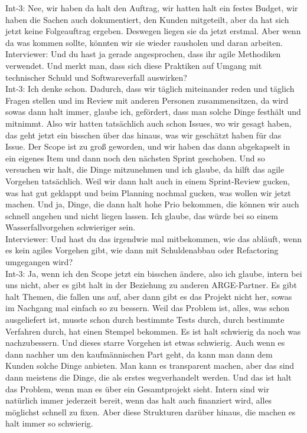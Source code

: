 Int-3: Nee, wir haben da halt den Auftrag, wir hatten halt ein festes Budget, wir haben die Sachen auch dokumentiert, den Kunden mitgeteilt, aber da hat sich jetzt keine Folgeauftrag ergeben. Deswegen liegen sie da jetzt erstmal. Aber wenn da was kommen sollte, könnten wir sie wieder rausholen und daran arbeiten. \\
Interviewer: Und du hast ja gerade angesprochen, dass ihr agile Methodiken verwendet. Und merkt man, dass sich diese Praktiken auf Umgang mit technischer Schuld und Softwareverfall auswirken?\\
Int-3: Ich denke schon. Dadurch, dass wir täglich miteinander reden und täglich Fragen stellen und im Review mit anderen Personen zusammensitzen, da wird sowas dann halt immer, glaube ich, gefördert, dass man solche Dinge festhält und mitnimmt. Also wir hatten tatsächlich auch schon Issues, wo wir gesagt haben, das geht jetzt ein bisschen über das hinaus, was wir geschätzt haben für das Issue. Der Scope ist zu groß geworden, und wir haben das dann abgekapselt in ein eigenes Item und dann noch den nächsten Sprint geschoben. Und so versuchen wir halt, die Dinge mitzunehmen und ich glaube, da hilft das agile Vorgehen tatsächlich. Weil wir dann halt auch in einem Sprint-Review gucken, was hat gut geklappt und beim Planning nochmal gucken, was wollen wir jetzt machen. Und ja, Dinge, die dann halt hohe Prio bekommen, die können wir auch schnell angehen und nicht liegen lassen. Ich glaube, das würde bei so einem Wasserfallvorgehen schwieriger sein. \\
Interviewer: Und hast du das irgendwie mal mitbekommen, wie das abläuft, wenn es kein agiles Vorgehen gibt, wie dann mit Schuldenabbau oder Refactoring umgegangen wird? \\
Int-3: Ja, wenn ich den Scope jetzt ein bisschen ändere, also ich glaube, intern bei uns nicht, aber es gibt halt in der Beziehung zu anderen ARGE-Partner. Es gibt halt Themen, die fallen uns auf, aber dann gibt es das Projekt nicht her, sowas im Nachgang mal einfach so zu bessern. Weil das Problem ist, alles, was schon ausgeliefert ist, musste schon durch bestimmte Tests durch, durch bestimmte Verfahren durch, hat einen Stempel bekommen. Es ist halt schwierig da noch was nachzubessern. Und dieses starre Vorgehen ist etwas schwierig. Auch wenn es dann nachher um den kaufmännischen Part geht, da kann man dann dem Kunden solche Dinge anbieten. Man kann es transparent machen, aber das sind dann meistens die Dinge, die als erstes wegverhandelt werden. Und das ist halt das Problem, wenn man es über ein Gesamtprojekt sieht. Intern sind wir natürlich immer jederzeit bereit, wenn das halt auch finanziert wird, alles möglichst schnell zu fixen. Aber diese Strukturen darüber hinaus, die machen es halt immer so schwierig. \\
